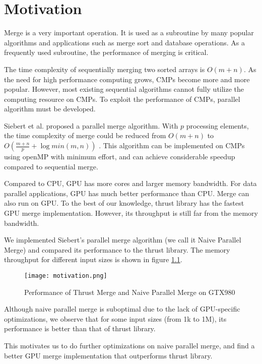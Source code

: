 \chapter{Motivation}\label{chap:motivation}
Merge is a very important operation. It is used as a subroutine by many popular algorithms and
applications such as merge sort and database operations. As a frequently used subroutine,
the performance of merging is critical. 

The time complexity of sequentially merging two sorted arrays is $O(m+n)$.
As the need for high performance computing grows, CMPs become more 
and more popular. However, most existing sequential algorithms cannot fully utilize the
computing resource on CMPs. To exploit the performance of CMPs, parallel algorithm must 
be developed. 

Siebert et al. \cite{pmalgo} proposed a parallel merge algorithm. With $p$ processing elements, 
the time complexity of merge could be 
reduced from $O(m+n)$ to $O(\frac{m+n}{p} + \log min(m,n))$ \cite{pmalgo}. This algorithm can be 
implemented on CMPs using openMP with minimum effort, and can achieve 
considerable speedup compared to sequential merge. 

Compared to CPU, GPU has more cores and larger memory bandwidth. For data parallel
applications, GPU has much better performance than CPU. 
Merge can also run on GPU. To the best of our knowledge, 
thrust library has the fastest GPU merge implementation. 
However, its throughput is still far from the memory bandwidth.


We implemented Siebert's parallel merge algorithm (we call it Naive Parallel Merge) and compared 
its performance to the thrust library. The memory throughput for different input
sizes is shown in figure \ref{fig:motivation}. 

\begin{figure}[!h]
\begin{center}
\texttt{[image: motivation.png]}
\end{center}
\caption{{\label{fig:motivation}} Performance of Thrust Merge and Naive Parallel Merge on GTX980}
\end{figure}

Although naive parallel merge is suboptimal due to the lack of GPU-specific optimizations, 
we observe that for some input sizes (from 1k to 1M), its performance is better than 
that of thrust library.  

This motivates us to do further optimizations on naive parallel merge, and find a better 
GPU merge implementation that outperforms thrust library.  